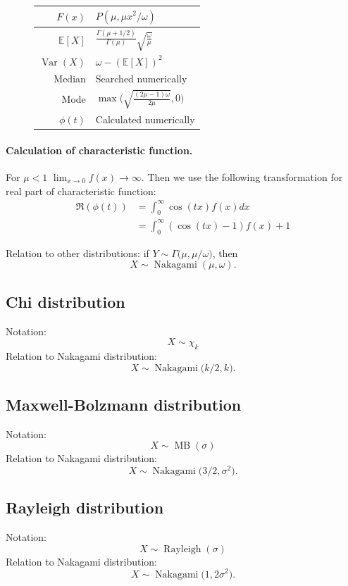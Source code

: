 \documentclass[a4paper,11pt]{article}
\theoremstyle{plain}
\theoremstyle{definition}
\newcommand{\ME}{\mathbb{E}}
\newcommand{\Var}{\operatorname{Var}}
\begin{document}
\begin{figure}[!htb]
\begin{minipage}{0.4\textwidth}
\begin{tabular}{| r | l |}
				\hline
				$F(x)$ & $P(\mu, \mu x^2/\omega) $\\
				\hline
				$\ME[X]$ & $ \frac{\Gamma(\mu + 1/2)}{\Gamma(\mu)} \sqrt{\frac{\omega}{\mu}}  $ \\
				\hline
				$\Var(X)$ & $\omega - (\ME[X])^2$ \\
				\hline
				Median & Searched numerically \\
				\hline
				Mode & $ \max \bigg( \sqrt{\frac{(2\mu-1)\omega}{2\mu}}, 0\bigg)$ \\
				\hline
				$\phi(t)$ & Calculated numerically \\
				\hline
			\end{tabular}
		\end{minipage}
	\end{figure}
	\paragraph{Calculation of characteristic function.} For $\mu < 1$ $\lim_{x \rightarrow 0}f(x) \rightarrow \infty$. Then we use the following transformation for real part of characteristic function:
	\[
	\begin{aligned}
	\Re(\phi(t)) & = \int_{0}^{\infty} \cos(tx) f(x) dx \\ &= \int_{0}^{\infty} (\cos(tx)-1) f(x) + 1
	\end{aligned}
	\]
	
	Relation to other distributions: if $Y \sim \Gamma\big(\mu, \mu/\omega\big)$, then
	\[
	X \sim \operatorname{Nakagami}(\mu, \omega).
	\]
	
	\subsection{Chi distribution}
	Notation:
	\[
	X \sim \chi_k
	\]
	Relation to Nakagami distribution:
	\[
	X \sim \operatorname{Nakagami}\big(k/2, k\big).
	\]
	
	\subsection{Maxwell-Bolzmann distribution}
	Notation:
	\[
	X \sim \operatorname{MB}(\sigma)
	\]
	Relation to Nakagami distribution:
	\[
	X \sim \operatorname{Nakagami}\big(3/2, \sigma^2 \big).
	\]
	
	\subsection{Rayleigh distribution}
	Notation:
	\[
	X \sim \operatorname{Rayleigh}(\sigma)
	\]
	Relation to Nakagami distribution:
	\[
	X \sim \operatorname{Nakagami}\big(1, 2\sigma^2\big).
	\]
\end{document}
